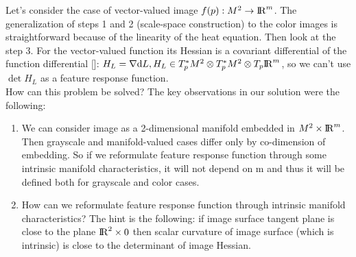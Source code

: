 \documentclass{llncs}
\newcommand{\toeuclidean}[1]{\rightarrow\bbbr^{#1}}
\newcommand{\CovariantDiff}{\nabla}
\newcommand{\Diff}{\mathrm{d}}
\newcommand{\TangentSpaceP}[1]{{T_p}{#1}}
\newcommand{\CotangentSpaceP}[1]{\tensor*{T}{^{*}_{p}}{#1}}
\begin{document}
Let’s consider the case of vector-valued image $f(p):M^2 \toeuclidean{m}$. The generalization of steps 1 and 2 (scale-space construction) to the color images is straightforward because of the linearity of the heat equation. Then look at the step 3. For the vector-valued function its Hessian is a covariant differential of the function differential []: $H_L=\CovariantDiff \Diff L ,H_L \in \CotangentSpaceP{M^2}\otimes\CotangentSpaceP{M^2}\otimes\TangentSpaceP{\bbbr^m}$, so we can’t use  $\det H_L$ as a feature response function. 
\\
How can this problem be solved? The key observations in our solution were the following:
\begin{enumerate}
\item	We can consider image as a 2-dimensional manifold embedded in $M^2\times{\rm I\!R}^m$. Then grayscale and manifold-valued cases differ only by co-dimension of embedding. So if we reformulate feature response function through some intrinsic manifold characteristics, it will not depend on m and thus it will be defined both for grayscale and color cases. 
\item	How can we reformulate feature response function through intrinsic manifold characteristics? The hint is the following: if image surface tangent plane is close to the plane ${\rm I\!R}^2\times 0$ then scalar curvature  of image surface (which is intrinsic) is close to the determinant of image Hessian. 
\end{enumerate}
\end{document}
